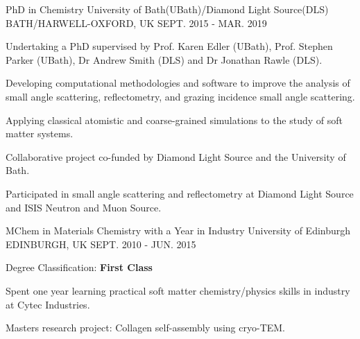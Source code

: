 \begin{cventries}
  \cventry
    {PhD in Chemistry}
    {University of Bath(UBath)/Diamond Light Source(DLS)}
    {BATH/HARWELL-OXFORD, UK}
    {SEPT. 2015 - MAR. 2019}
    {
      \begin{cvitems}
        \item {Undertaking a PhD supervised by Prof. Karen Edler (UBath), Prof. Stephen Parker (UBath), Dr Andrew Smith (DLS) and Dr Jonathan Rawle (DLS).}
        \item {Developing computational methodologies and software to improve the analysis of small angle scattering, reflectometry, and grazing incidence small angle scattering.}
        \item {Applying classical atomistic and coarse-grained simulations to the study of soft matter systems.}
        \item {Collaborative project co-funded by Diamond Light Source and the University of Bath.}
        \item {Participated in small angle scattering and reflectometry at Diamond Light Source and ISIS Neutron and Muon Source.}
      \end{cvitems}
    }
  \cventry
    {MChem in Materials Chemistry with a Year in Industry}
    {University of Edinburgh}
    {EDINBURGH, UK}
    {SEPT. 2010 - JUN. 2015}
    {
      \begin{cvitems}
        \item {Degree Classification: \textbf{First Class}}
        \item {Spent one year learning practical soft matter chemistry/physics skills in industry at Cytec Industries.}
        \item {Masters research project: Collagen self-assembly using cryo-TEM.}
      \end{cvitems}
    }
\end{cventries}

